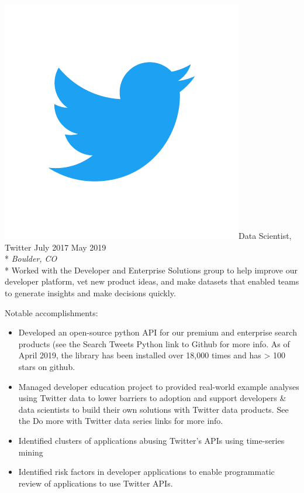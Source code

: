 \documentclass[print]{friggeri-cv} %
\newcommand{\twittericon}{\includegraphics[scale=0.05]{Twitter_Logo_Blue.png}}%
\begin{document}
\begin{description} \itemsep1pt \parskip0pt 
  \item \twittericon {\largeheaderfont Data Scientist, Twitter } \hfill
    {\smallheaderfont July 2017 \textemdash  May 2019}\\*
    {\footnotesize \emph{Boulder, CO}} \\*
    Worked with the Developer and Enterprise Solutions group to help improve our
    developer platform, vet new product ideas, and make datasets that enabled
    teams to generate insights and make decisions quickly.

    {\smallheaderfont Notable accomplishments}:
    \begin{itemize} \itemsep1pt \parskip1pt 
      \item Developed an open-source python API for our premium and enterprise search
          products (see the Search Tweets Python link to Github for more info. As of
          April 2019, the library has been installed over 18,000 times and has > 100
          stars on github.
      \item Managed developer education project to provided real-world example analyses
        using Twitter data to lower barriers to adoption and support developers \& data
        scientists to build their own solutions with Twitter data products. See the Do
        more with Twitter data series links for more info.
      \item Identified clusters of applications abusing Twitter's APIs using time-series mining
      \item Identified risk factors in developer applications to enable programmatic
            review of applications to use Twitter APIs.
    \end{itemize}
\end{description}
\end{document}
